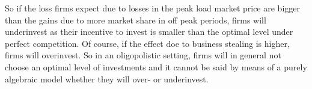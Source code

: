 So if the loss firms expect due to losses in the peak load market price are bigger than the gains due to more market share in off peak periods, firms will underinvest as their incentive to invest is smaller than the optimal level under perfect competition. Of course, if the effect doe to business stealing is higher, firms will overinvest. So in an oligopolistic setting, firms will in general not choose an optimal level of investments and it cannot be said by means of a purely algebraic model whether they will over- or underinvest.






